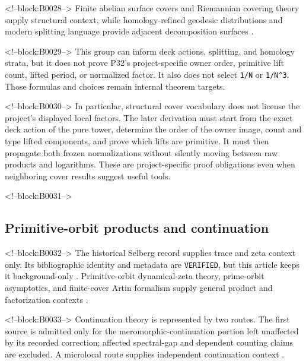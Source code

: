 \documentclass[11pt]{article}
\begin{document}
<!--block:B0028-->
Finite abelian surface covers and Riemannian covering theory supply
structural context, while homology-refined geodesic distributions and
modern splitting language provide adjacent decomposition surfaces
\citep{P32-S07,P32-S08,P32-S09,P32-S10,P32-S11,P32-S12}.

<!--block:B0029-->
This group can inform deck actions, splitting, and homology strata, but
it does not prove P32's project-specific owner order, primitive lift
count, lifted period, or normalized factor. It also does not select
\texttt{1/N} or \texttt{1/N\^{}3}. Those formulas and choices remain
internal theorem targets.

<!--block:B0030-->
In particular, structural cover vocabulary does not license the
project's displayed local factors. The later derivation must start from
the exact deck action of the pure tower, determine the order of the
owner image, count and type lifted components, and prove which lifts are
primitive. It must then propagate both frozen normalizations without
silently moving between raw products and logarithms. These are
project-specific proof obligations even when neighboring cover results
suggest useful tools.

<!--block:B0031-->
\hypertarget{23-primitive-orbit-products-and-continuation}{%
\subsection{Primitive-orbit products and
continuation}\label{23-primitive-orbit-products-and-continuation}}

<!--block:B0032-->
The historical Selberg record supplies trace and zeta context only. Its
bibliographic identity and metadata are \texttt{VERIFIED}, but this
article keeps it background-only
\citep{P32-S13}.
Primitive-orbit dynamical-zeta theory, prime-orbit asymptotics, and
finite-cover Artin formalism supply general product and factorization
contexts
\citep{P32-S14,P32-S15,P32-S16}.

<!--block:B0033-->
Continuation theory is represented by two routes. The first source is
admitted only for the meromorphic-continuation portion left unaffected
by its recorded correction; affected spectral-gap and dependent counting
claims are excluded. A microlocal route supplies independent
continuation context
\citep{P32-S17,P32-S18}.
\end{document}
